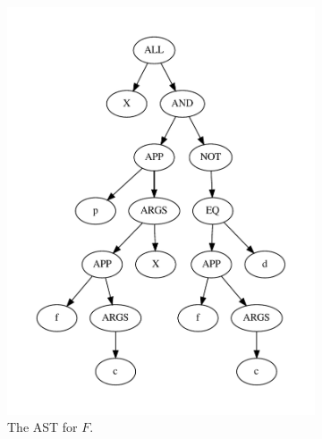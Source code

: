 \documentclass[runningheads]{llncs}
\begin{document}
\begin{figure}
	\centering
	\begin{subfigure}{.4\textwidth}
		\centering
		\includegraphics[width=\linewidth]{translation-ast}
		\caption{The AST for \(F\).}
	\end{subfigure}
	\begin{subfigure}{.3\textwidth}
		\centering

\end{subfigure}
\end{figure}
\end{document}
